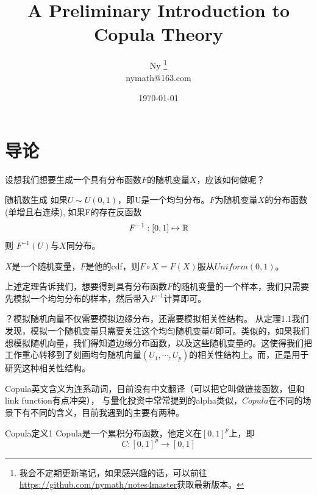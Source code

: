 \documentclass[12pt]{article}
\begin{document}
	\begin{figure}
	\end{figure}
	\title{A Preliminary Introduction to Copula Theory}
	\author{Ny 
	\footnote{我会不定期更新笔记，如果感兴趣的话，可以前往
	\href{https://github.com/nymath/notes4master}{https://github.com/nymath/notes4master}获取最新版本。}\\
	nymath@163.com}
	\date{\today}
	\maketitle
	\tableofcontents
	\listoffigures
	\listoftables
\newpage
\section{导论}
设想我们想要生成一个具有分布函数$F$的随机变量$X$，应该如何做呢？
\begin{stheorem}{随机数生成}{}
如果$U\sim U(0,1)$，即U是一个均匀分布。$F$为随机变量$X$的分布函数(单增且右连续), 如果F的存在反函数
$$
F^{-1}: [0,1] \mapsto \mathbb{R}
$$
则
$F^{-1}(U)$与$X$同分布。

\end{stheorem}
\begin{sremark}{}{}
$X$是一个随机变量，$F$是他的cdf，则$F \circ X = F(X)$服从$Uniform(0,1)$。	
\end{sremark}
上述定理告诉我们，想要得到具有分布函数$F$的随机变量的一个样本，我们只需要先模拟一个均匀分布的样本，然后带入$F^{-1}$计算即可。\par

？模拟随机向量不仅需要模拟边缘分布，还需要模拟相关性结构。 从定理1.1我们发现，模拟一个随机变量只需要关注这个均匀随机变量$U$即可。类似的，如果我们想模拟随机向量，我们得知道边缘分布函数，以及这些随机变量的。这使得我们把工作重心转移到了刻画均匀随机向量$(U_1,\cdots,U_p)$的相关性结构上。而，正是用于研究这种相关性结构。 \par
Copula英文含义为连系动词，目前没有中文翻译（可以把它叫做链接函数，但和link function有点冲突），
与量化投资中常常提到的alpha类似，$Copula$在不同的场景下有不同的含义，目前我遇到的主要有两种。




\begin{sdefinition}{Copula定义1}{}
Copula是一个累积分布函数，他定义在$[0,1]^p$上，即
$$
C: [0,1]^p \to [0,1]
$$
\end{sdefinition}
\end{document}
